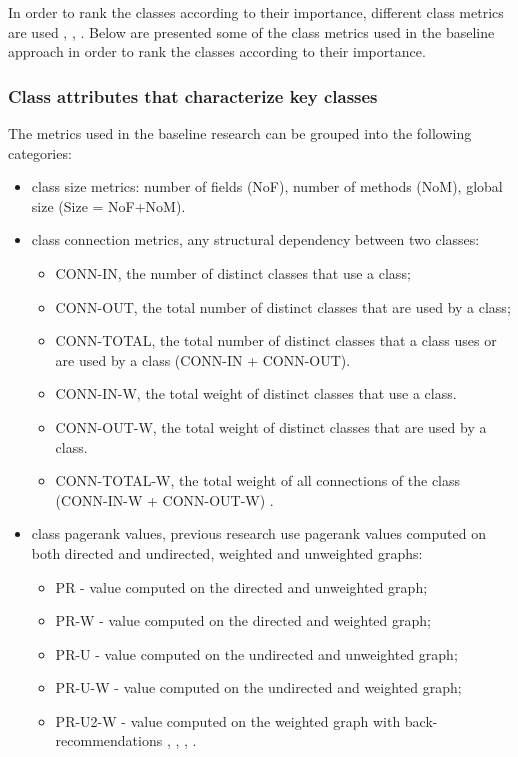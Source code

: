 \documentclass[12pt, a4paper, twoside]{report}
\begin{document}
In order to rank the classes according to their importance, different class metrics are used \cite{Ding2016AnIA}, \cite{ZaidmanJurnal}, \cite{PAN2018188}. Below are presented some of the class metrics used in the baseline approach in order to rank the classes according to their importance.



\subsubsection{Class attributes that characterize key classes}
The metrics used in the baseline research can be grouped into the following categories: 

\begin{itemize}
	\item class size metrics: number of fields (NoF),  number of methods (NoM), global size (Size = NoF+NoM).
	\item class connection metrics, any structural dependency between two classes:
		\begin{itemize}
			\item CONN-IN, the number of distinct classes that use a class;
			\item CONN-OUT, the total number of distinct classes that are used by a class;
			\item CONN-TOTAL, the total number of distinct classes that a class uses or are used by a class (CONN-IN + CONN-OUT).
			\item CONN-IN-W, the total weight of distinct classes that use a class. 
			\item CONN-OUT-W, the total weight of distinct classes that are used by a class. 
			\item CONN-TOTAL-W, the total weight of all connections of the class (CONN-IN-W + CONN-OUT-W) \cite{Finding-key-classes}.
		\end{itemize}
	\item class pagerank values, previous research use pagerank values computed on both directed and undirected, weighted and unweighted graphs:
		\begin{itemize}
			\item PR - value computed on the directed and unweighted graph;
			\item PR-W - value computed on the directed and weighted graph;
			\item PR-U - value computed on the undirected and unweighted graph;
			\item PR-U-W - value computed on the undirected and weighted graph;
			\item PR-U2-W - value computed on the weighted graph with back-recommendations \cite{PagerankENASE}, \cite{enase15}, \cite{Finding-key-classes}, \cite{PagerankSACI}.
		\end{itemize}
\end{itemize}
\end{document}
